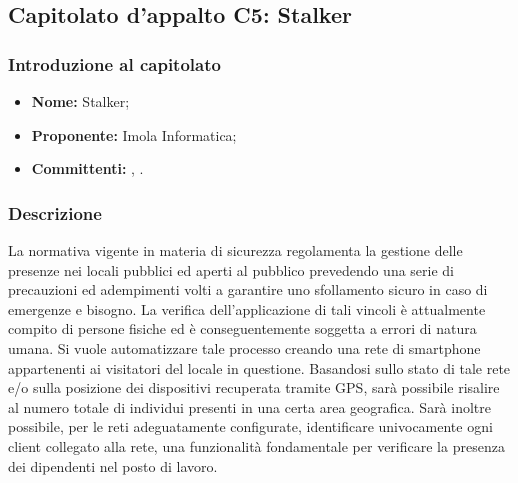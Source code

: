 \subsection{Capitolato d'appalto C5: Stalker}
	\subsubsection{Introduzione al capitolato}
	\begin{itemize}
		\item \textbf{Nome:} Stalker;
		\item \textbf{Proponente}\textbf{:} Imola Informatica;
		\item \textbf{Committenti}\textbf{:} \TV, \RC.
	\end{itemize}
	
	\subsubsection{Descrizione}
	La normativa vigente in materia di sicurezza regolamenta la gestione delle presenze nei locali pubblici ed aperti al pubblico prevedendo una serie di precauzioni ed adempimenti volti a garantire uno sfollamento sicuro in caso di emergenze e bisogno. La verifica dell'applicazione di tali vincoli è attualmente compito di persone fisiche ed è conseguentemente soggetta a errori di natura umana.
	Si vuole automatizzare tale processo creando una rete di smartphone appartenenti ai visitatori del locale in questione. Basandosi sullo stato di tale rete e/o sulla posizione dei dispositivi recuperata tramite GPS, sarà possibile risalire al numero totale di individui presenti in una certa area geografica. Sarà inoltre possibile, per le reti adeguatamente configurate, identificare univocamente ogni client collegato alla rete, una funzionalità fondamentale per verificare la presenza dei dipendenti nel posto di lavoro.
	
